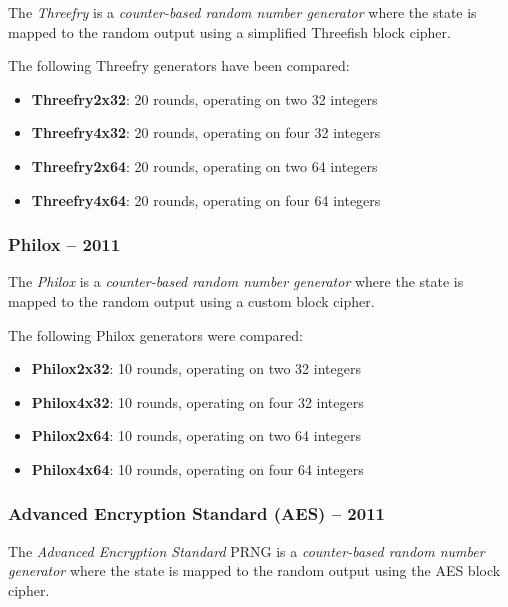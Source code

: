     The \emph{Threefry} is a \emph{counter-based random number generator} where the state is mapped to the random output using a simplified Threefish block cipher.

    The following Threefry generators have been compared:
    \begin{itemize}
		\itemsep0em
        \item \textbf{Threefry2x32}: 20 rounds, operating on two  \SI{32}{\bit} integers
        \item \textbf{Threefry4x32}: 20 rounds, operating on four \SI{32}{\bit} integers
        \item \textbf{Threefry2x64}: 20 rounds, operating on two  \SI{64}{\bit} integers
        \item \textbf{Threefry4x64}: 20 rounds, operating on four \SI{64}{\bit} integers
    \end{itemize}

\subsubsection[Philox -- 2011]{Philox -- 2011} \label{subsubsec:philox}

    The \emph{Philox} is a \emph{counter-based random number generator} where the state is mapped to the random output using a custom block cipher.

    The following Philox generators were compared:
    \begin{itemize}
		\itemsep0em
        \item \textbf{Philox2x32}: 10 rounds, operating on two  \SI{32}{\bit} integers
        \item \textbf{Philox4x32}: 10 rounds, operating on four \SI{32}{\bit} integers
        \item \textbf{Philox2x64}: 10 rounds, operating on two  \SI{64}{\bit} integers
        \item \textbf{Philox4x64}: 10 rounds, operating on four \SI{64}{\bit} integers
    \end{itemize}

\subsubsection[Advanced Encryption Standard (AES) -- 2011]{Advanced Encryption Standard (AES) -- 2011} \label{subsubsec:aes}

    The \emph{Advanced Encryption Standard} PRNG is a \emph{counter-based random number generator} where the state is mapped to the random output using the AES block cipher.

